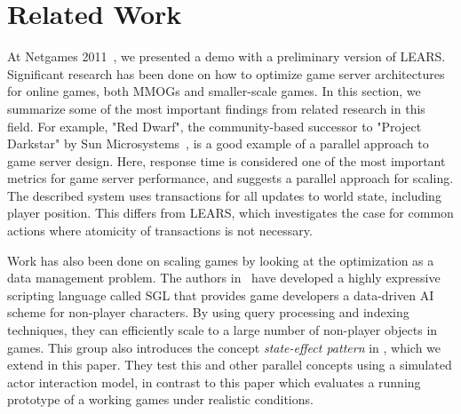 \section{Related Work}\label{sec:related}
At Netgames 2011~\cite{raaen++2011}, we presented a demo with a preliminary version of LEARS.
%
Significant research has been done on how to optimize game server
architectures for online games, both MMOGs and smaller-scale games. In
this section, we summarize some of the most important findings from
related research in this field. 
%
For example, "Red Dwarf", the community-based successor to "Project
Darkstar" by Sun Microsystems~\cite{waldo-2008}, is a good example 
of a parallel approach to game server design. Here, response time is 
considered one of the most important metrics for game server performance, 
and suggests a parallel approach for scaling. The described system 
uses transactions for all updates to world state, including player 
position. This differs from LEARS, which investigates the case for common actions where atomicity of transactions is not necessary. 

Work has also been done on scaling games by looking at the
optimization as a data management problem. The authors
in~\cite{white-2007} have developed a highly expressive scripting
language called SGL that provides game developers a data-driven AI
scheme for non-player characters. By using query processing and
indexing techniques, they can efficiently scale to a large number of
non-player objects in games. This group also introduces the concept \textit{state-effect pattern} in \cite{white++2008}, which we extend in this paper. They test this and other parallel concepts using a simulated actor interaction model, in contrast to this paper which evaluates a running prototype of a working games under realistic conditions.


